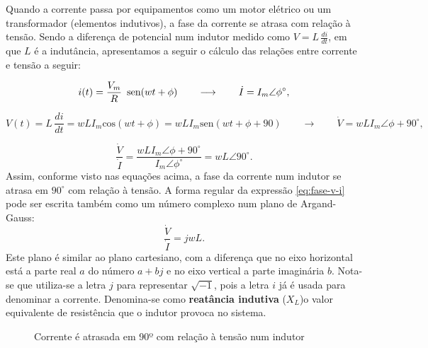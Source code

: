 Quando a corrente passa por equipamentos como um motor elétrico ou
um transformador (elementos indutivos), a fase da corrente se atrasa
com relação à tensão. Sendo a diferença de potencial num indutor medido
como $V=L\,\frac{di}{dt}$, em que $L$ é a indutância, apresentamos a seguir o cálculo das relações
entre corrente e tensão a seguir:

\[
i(t)=\frac{V_{m}}{R}\mbox{\,\ sen}(wt+\phi)\qquad\longrightarrow\qquad\dot{I}=I_{m}\angle\phi^{\circ},
\]


\[
V(t)=L\,\frac{di}{dt}=wLI_{m}\mbox{cos}(wt+\phi)=wLI_{m}\mbox{sen}(wt+\phi+90)\qquad\longrightarrow\qquad\dot{V}=wLI_{m}\angle\phi+90^{\circ},
\]


\begin{equation}
\frac{\dot{V}}{\dot{I}}=\frac{wLI_{m}\angle\phi+90^{\circ}}{I_{m}\angle\phi^{\circ}}=wL\angle90^{\circ}.\label{eq:fase-v-i}
\end{equation}
Assim, conforme visto nas equações acima, a fase da corrente num indutor
se atrasa em $90^{\circ}$ com relação à tensão. A forma regular da
expressão \ref{eq:fase-v-i} pode ser escrita também como um número
complexo num plano de Argand-Gauss: 
\[
\frac{\dot{V}}{\dot{I}}=jwL.
\]
Este plano é similar ao plano cartesiano, com a diferença que no eixo horizontal está a parte real $a$ do número $a+bj$ e no eixo vertical a parte imaginária $b.$ Nota-se que utiliza-se a letra $j$ para representar $\sqrt{-1}$, pois a letra $i$ já é usada para denominar a corrente. Denomina-se como \textbf{reatância indutiva} ($X_L$)o valor equivalente de resistência que o indutor provoca no sistema. 



\begin{figure}[H]
\begin{center}
\caption{\label{fig:fase-ct-indutor}Corrente é atrasada em 90º com relação à tensão num indutor}
\end{center}
\end{figure}



